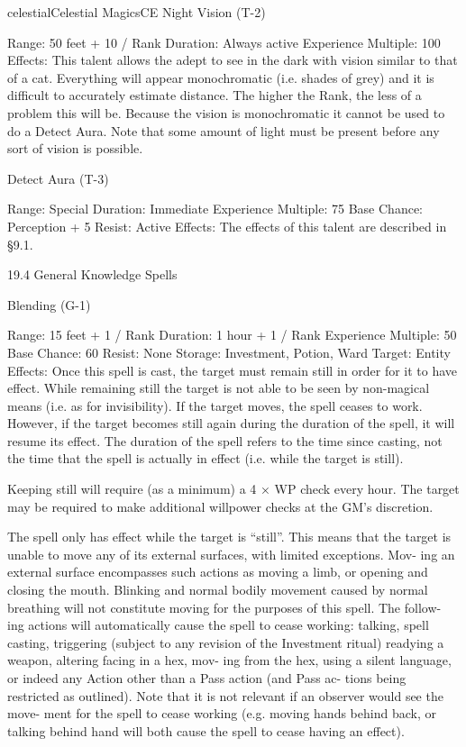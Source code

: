 \begin{College}[1.3]{celestial}{Celestial Magics}{CE}
Night Vision (T-2) 

Range: 50 feet + 10 / Rank 
Duration: Always active 
Experience Multiple: 100 
Effects:  This  talent  allows  the  adept  to  see  in  the 
dark with vision similar to that of a cat. Everything 
will  appear  monochromatic  (i.e.  shades  of  grey) 
and  it  is  difficult  to  accurately  estimate  distance. 
The higher the Rank, the less of a problem this will 
be. Because the vision is monochromatic it cannot 
be  used  to  do  a  Detect  Aura.  Note  that  some 
amount of light must be present before any sort of 
vision is possible. 

Detect Aura (T-3) 

Range: Special 
Duration: Immediate 
Experience Multiple: 75 
Base Chance: Perception + 5%
Resist: Active 
Effects:  The  effects  of  this  talent  are  described  in 
§9.1. 

19.4 General Knowledge Spells 

Blending (G-1) 

Range: 15 feet + 1 / Rank 
Duration: 1 hour + 1 / Rank 
Experience Multiple: 50 
Base Chance: 60%
Resist: None 
Storage: Investment, Potion, Ward 
Target: Entity 
Effects:  Once  this  spell  is  cast,  the  target  must 
remain  still  in  order  for  it  to  have  effect.  While 
remaining  still  the  target  is  not  able  to  be  seen  by 
non-magical  means  (i.e.  as  for  invisibility).  If  the 
target moves, the spell ceases to work. However, if 
the target becomes still again during the duration of 
the  spell,  it  will  resume  its  effect.  The  duration  of 
the  spell  refers  to  the  time  since  casting,  not  the 
time  that  the  spell  is  actually  in  effect  (i.e.  while 
the target is still). 

Keeping still will require (as a minimum) a 4 × WP 
check  every  hour.  The  target  may  be  required  to 
make  additional  willpower  checks  at  the  GM’s 
discretion. 

The spell only has effect while the target is “still”. 
This means that the target is unable to move any of 
its external surfaces, with limited exceptions. Mov-
ing  an  external  surface  encompasses  such  actions 
as  moving  a  limb,  or  opening  and  closing  the 
mouth.  Blinking  and  normal  bodily  movement 
caused  by  normal  breathing  will  not  constitute 
moving  for  the  purposes  of  this  spell.  The  follow-
ing  actions  will  automatically  cause  the  spell  to 
cease  working:  talking,  spell  casting,  triggering 
(subject  to  any  revision  of  the  Investment  ritual) 
readying  a  weapon,  altering  facing  in  a  hex,  mov-
ing from the hex, using a silent language, or indeed 
any  Action  other  than  a  Pass  action  (and  Pass  ac-
tions  being  restricted  as  outlined).  Note  that  it  is 
not  relevant  if  an  observer  would  see  the  move-
ment  for  the  spell  to  cease  working  (e.g.  moving 
hands  behind  back,  or  talking  behind  hand  will 
both cause the spell to cease having an effect). 


\end{College}
